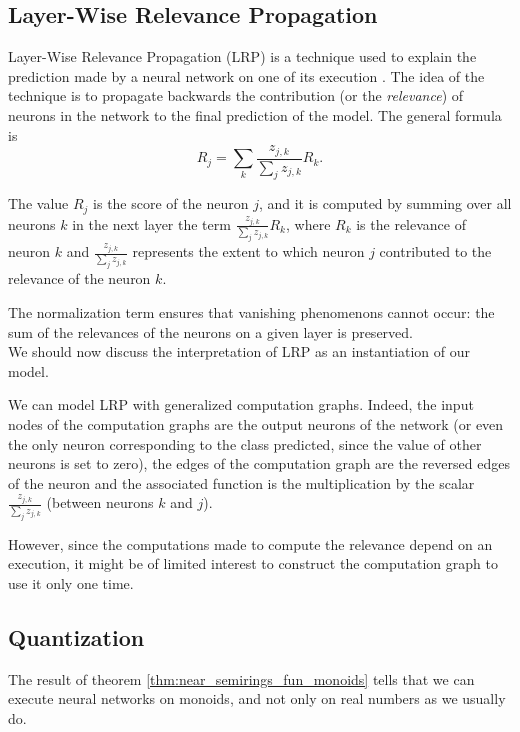 \documentclass[11pt,a4paper]{article}
\theoremstyle{definition}
\begin{document}
	\subsection{Layer-Wise Relevance Propagation}

		
	Layer-Wise Relevance Propagation (LRP) is a technique used to explain the prediction made by a neural network on one of its execution . The idea of the technique is to propagate backwards the contribution (or the \textit{relevance}) of neurons in the network to the final prediction of the model. The general formula is 
		$$ R_j = \underset{k}{\sum} \frac{z_{j,k}}{\sum_j z_{j,k}} R_k .$$
		
	The value $R_j$ is the score of the neuron $j$, and it is computed by summing over all neurons $k$ in the next layer the term $\frac{z_{j,k}}{\sum_j z_{j,k}} R_k$, where $R_k$ is the relevance of neuron $k$ and $\frac{z_{j,k}}{\sum_j z_{j,k}}$ represents the extent to which neuron $j$ contributed to the relevance of the neuron $k$.
		
	The normalization term ensures that vanishing phenomenons cannot occur: the sum of the relevances of the neurons on a given layer is preserved.
		\\
		
	We should now discuss the interpretation of LRP as an instantiation of our model.
		
	We can model LRP with generalized computation graphs. Indeed, the input nodes of the computation graphs are the output neurons of the network (or even the only neuron corresponding to the class predicted, since the value of other neurons is set to zero), the edges of the computation graph are the reversed edges of the neuron and the associated function is the multiplication by the scalar $\frac{z_{j,k}}{\sum_j z_{j,k}}$ (between neurons $k$ and $j$).
	
	However, since the computations made to compute the relevance depend on an execution, it might be of limited interest to construct the computation graph to use it only one time.
	
		
\subsection{Quantization}
	
	The result of theorem \ref{thm:near_semirings_fun_monoids} tells that we can execute neural networks on monoids, and not only on real numbers as we usually do.
	
\end{document}
